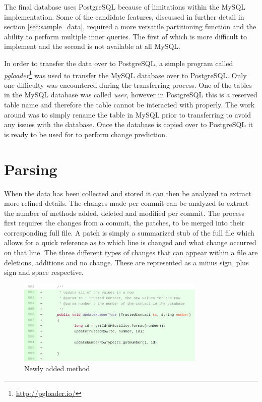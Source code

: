 The final database uses PostgreSQL because of limitations within the MySQL implementation. Some of the candidate features, discussed in further detail in section \ref{sec:sample_data}, required a more versatile partitioning function and the ability to perform multiple inner queries. The first of which is more difficult to implement and the second is not available at all MySQL.

In order to transfer the data over to PostgreSQL, a simple program called \textit{pgloader}\footnote{\url{http://pgloader.io/}} was used to transfer the MySQL database over to PostgreSQL. Only one difficulty was encountered during the transferring process. One of the tables in the MySQL database was called \textit{user}, however in PostgreSQL this is a reserved table name and therefore the table cannot be interacted with properly. The work around was to simply rename the table in MySQL prior to transferring to avoid any issues with the database. Once the database is copied over to PostgreSQL it is ready to be used for to perform change prediction.

\section{Parsing}
\label{sec:parsing}

When the data has been collected and stored it can then be analyzed to extract more refined details. The changes made per commit can be analyzed to extract the number of methods added, deleted and modified per commit. The process first requires the changes from a commit, the patches, to be merged into their corresponding full file. A patch is simply a summarized stub of the full file which allows for a quick reference as to which line is changed and what change occurred on that line. The three different types of changes that can appear within a file are deletions, additions and no change. These are represented as a minus sign, plus sign and space respective.

\begin{figure}[!ht]
    \centering
        \includegraphics[width=0.80\textwidth]{images/added_example}
    \caption{Newly added method}
    \label{fig:added_method}
\end{figure}

